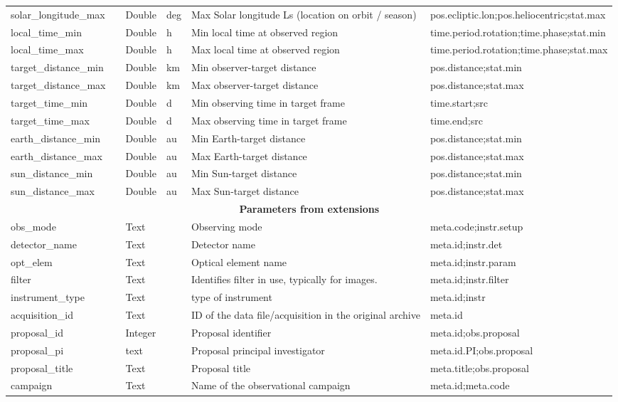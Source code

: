 \documentclass[11pt,a4paper]{ivoa}
\begin{document}
\begin{longtable}{p{3.5cm}p{0.5cm}p{1cm}p{1cm}p{7cm}p{3cm}}
solar\_longitude\_max&&Double&deg&Max Solar longitude Ls (location on orbit / season)&pos.ecliptic.lon;pos.heliocentric;stat.max \\
local\_time\_min&&Double&h&Min local time at observed region&time.period.rotation;time.phase;stat.min\\
local\_time\_max&&Double&h&Max local time at observed region&time.period.rotation;time.phase;stat.max \\
target\_distance\_min&&Double&km&Min observer-target distance&pos.distance;stat.min\\
target\_distance\_max&&Double&km&Max observer-target distance&pos.distance;stat.max\\
target\_time\_min&&Double&d&Min observing time in target frame &time.start;src\\
target\_time\_max&&Double&d&Max observing time in target frame&time.end;src\\
earth\_distance\_min&&Double&au&Min Earth-target distance&pos.distance;stat.min\\
earth\_distance\_max&&Double&au&Max Earth-target distance&pos.distance;stat.max\\
sun\_distance\_min&&Double&au&Min Sun-target distance&pos.distance;stat.min\\
sun\_distance\_max&&Double&au&Max Sun-target distance&pos.distance;stat.max\\
\multicolumn{6}{c}{\vrule width 0pt height 20pt depth 12pt \textbf{\textbf{Parameters from extensions}}}\\
obs\_mode&&Text&&Observing mode&meta.code;instr.setup\\
detector\_name&&Text&&Detector name&meta.id;instr.det\\
opt\_elem&&Text&&Optical element name&meta.id;instr.param\\
filter&&Text& &Identifies filter in use, typically for images.&meta.id;instr.filter\\
instrument\_type&&Text&&type of instrument&meta.id;instr\\
acquisition\_id&&Text&&ID of the data file/acquisition in the original archive&meta.id\\
proposal\_id&&Integer&&Proposal identifier&meta.id;obs.proposal\\
proposal\_pi&&text&&Proposal principal investigator&meta.id.PI;obs.proposal\\
proposal\_title&&Text&&Proposal title&meta.title;obs.proposal\\
campaign&&Text&&Name of the observational campaign&meta.id;meta.code\\

\end{longtable}
\end{document}
